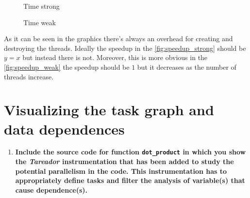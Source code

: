 \documentclass[a4paper]{article}
\begin{document}
\begin{figure}[H]
    \begin{minipage}[t]{0.5\linewidth}
        \caption{Time strong}
        \label{fig:time_strong}
    \end{minipage}
    \begin{minipage}[t]{0.5\linewidth}
        \caption{Time weak}
        \label{fig:time_weak}
    \end{minipage}
\end{figure}


As it can be seen in the graphics there's always an overhead for creating and destroying the threads. Ideally the speedup in the \autoref{fig:speedup_strong} should be $y = x$ but instead there is not. Moreover, this is more obvious in the \autoref{fig:speedup_weak} the speedup should be $1$ but it decreases as the number of threads increase.

\section*{Visualizing the task graph and data dependences}

\begin{enumerate}[resume]
	\item \textbf{Include the source code for function \texttt{dot\_product} in which you show the \textit{Tareador} instrumentation that has been added to study the potential parallelism in the code. This instrumentation has to appropriately define tasks and filter the analysis of variable(s) that cause dependence(s).}
\end{enumerate}
\end{document}
